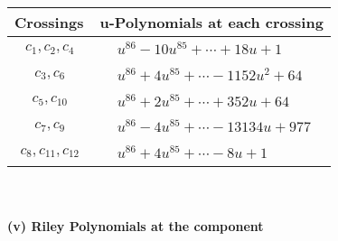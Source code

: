 \documentclass[1p]{elsarticle_modified}
\theoremstyle{definition}
\begin{document}
\begin{tabular}{m{50pt}|m{274pt}}
Crossings & \hspace{64pt}u-Polynomials at each crossing \\
\hline $$\begin{aligned}c_{1},c_{2},c_{4}\end{aligned}$$&$\begin{aligned}
&u^{86}-10 u^{85}+\cdots+18 u+1
\end{aligned}$\\
\hline $$\begin{aligned}c_{3},c_{6}\end{aligned}$$&$\begin{aligned}
&u^{86}+4 u^{85}+\cdots-1152 u^2+64
\end{aligned}$\\
\hline $$\begin{aligned}c_{5},c_{10}\end{aligned}$$&$\begin{aligned}
&u^{86}+2 u^{85}+\cdots+352 u+64
\end{aligned}$\\
\hline $$\begin{aligned}c_{7},c_{9}\end{aligned}$$&$\begin{aligned}
&u^{86}-4 u^{85}+\cdots-13134 u+977
\end{aligned}$\\
\hline $$\begin{aligned}c_{8},c_{11},c_{12}\end{aligned}$$&$\begin{aligned}
&u^{86}+4 u^{85}+\cdots-8 u+1
\end{aligned}$\\
\hline
\end{tabular}\\~\\
\newpage\renewcommand{\arraystretch}{1}
\flushleft \textbf{(v) Riley Polynomials at the component}\newline \\
\end{document}
